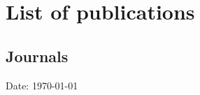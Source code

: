 \documentclass[mm,9pt,a4paper]{simple_style}
\begin{document}
\section{List of publications}
\subsection{Journals}

\vfill
\hfill Date: \today
\nocite{*}
\end{document}
